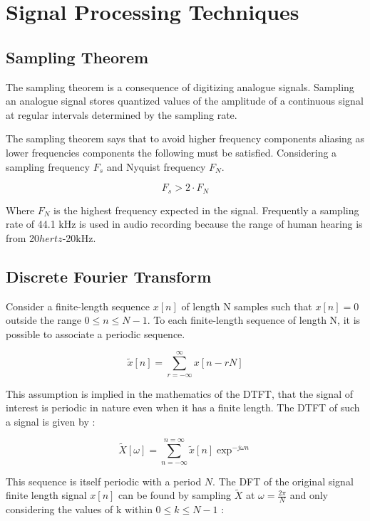 \section{Signal Processing Techniques}
\subsection{Sampling Theorem}

The sampling theorem is a consequence of digitizing analogue signals. Sampling
an analogue signal stores quantized values of the amplitude of a continuous
signal at regular intervals determined by the sampling rate.

The sampling theorem says that to avoid higher frequency components aliasing as
lower frequencies components the following must be satisfied. Considering a
sampling frequency $F_{s}$ and Nyquist frequency $F_{N}$.

\begin{equation}
  F_{s} > 2\cdot F_{N}
\end{equation}

Where $F_{N}$ is the highest frequency expected in the signal. Frequently a sampling
rate of 44.1 $\si{\kilo\hertz}$ is used in audio recording because the range of
human hearing is from 20$\si{hertz}$-20$\si{\kilo\hertz}$.

\subsection{Discrete Fourier Transform}

Consider a finite-length sequence $x[n]$ of length N samples such that $x[n] =
  0$ outside the range $0 \leq  n \leq N - 1$. To each finite-length sequence of
length N, it is possible to associate a periodic sequence.

\begin{equation}
  \tilde{x}[n] =\sum_{r=-\infty}^{\infty} x[n-r N]
\end{equation}

This assumption is implied in the mathematics of the \ac{DTFT}, that the signal of interest is
periodic in nature even when it has a finite length. The \ac{DTFT} of such a signal is given by :

\begin{equation}
  \tilde{X}[\omega] =\sum_{n=-\infty}^{n=\infty} \tilde{x}[n] \exp^{-j \omega n }
\end{equation}

This sequence is itself periodic with a period $N$. The \ac{DFT} of the original signal finite length signal $x[n]$ can be found
by sampling $\tilde{X}$ at $\omega=\frac{2 \pi}{N}$ and only considering the
values of k within $0 \leq  k \leq N - 1$ :

